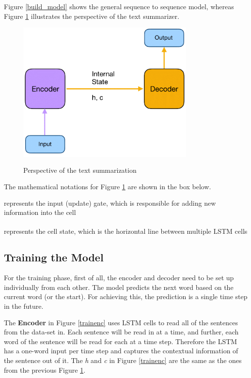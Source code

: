 Figure \ref{build_model} shows the general sequence to sequence model, whereas Figure \ref{modelenc} illustrates the perspective of the text summarizer. 

\begin{figure}
	\begin{center}
		\includegraphics[width=3.5in]{photos/modelenc-1}\\
		\caption{Perspective of the text summarization}\label{modelenc}
	\end{center}
\end{figure}

The mathematical notations for Figure \ref{modelenc} are shown in the box below.

\begin{tcolorbox}
	 represents the input (update) gate, which is responsible for adding new information into the cell \\ \\
	 represents the cell state, which is the horizontal line between multiple LSTM cells
\end{tcolorbox}

\subsection{Training the Model}

For the training phase, first of all, the encoder and decoder need to be set up individually from each other. The model predicts the next word based on the current word (or the start). For achieving this, the prediction is a single time step in the future. 

The \textbf{Encoder} in Figure \ref{trainenc} uses LSTM cells to read all of the sentences from the data-set in. Each sentence will be read in at a time, and further, each word of the sentence will be read for each at a time step. Therefore the LSTM has a one-word input per time step and captures the contextual information of the sentence out of it.  The \textit{h} and \textit{c} in Figure \ref{trainenc} are the same as the ones from the previous Figure \ref{modelenc}. 

